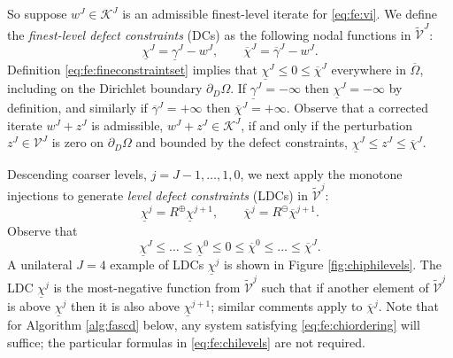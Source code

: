 \documentclass[letterpaper,final,12pt,reqno]{amsart}
\theoremstyle{cstyle}
\theoremstyle{cstyle*}
\theoremstyle{dstyle}
\numberwithin{equation}{section}
\numberwithin{figure}{section}
\numberwithin{table}{section}
\numberwithin{theorem}{section}
\newcommand{\cK}{\mathcal{K}}
\newcommand{\maxR}{R^{\bm{\oplus}}}
\newcommand{\minR}{R^{\bm{\ominus}}}
\begin{document}
So suppose $w^J \in \cK^J$ is an admissible finest-level iterate for \eqref{eq:fe:vi}.  We define the \emph{finest-level defect constraints} (DCs) \cite{GraeserKornhuber2009} as the following nodal functions in $\tilde{\mathcal{V}}^J$:
\begin{equation}
\underline{\chi}^J = \underline{\gamma}^J - w^J, \qquad \overline{\chi}^J = \overline{\gamma}^J - w^J. \label{eq:fe:defectconstraints}
\end{equation}
Definition \eqref{eq:fe:fineconstraintset} implies that $\underline{\chi}^J \le 0 \le \overline{\chi}^J$ everywhere in $\overline{\Omega}$, including on the Dirichlet boundary $\partial_D\Omega$.  If $\underline{\gamma}^J=-\infty$ then $\underline{\chi}^J=-\infty$ by definition, and similarly if $\overline{\gamma}^J=+\infty$ then $\overline{\chi}^J=+\infty$.  Observe that a corrected iterate $w^J + z^J$ is admissible, $w^J + z^J \in \cK^J$, if and only if the perturbation $z^J \in \mathcal{V}^J$ is zero on $\partial_D\Omega$ and bounded by the defect constraints, $\underline{\chi}^J \le z^J \le \overline{\chi}^J$.

Descending coarser levels, $j=J-1,\dots,1,0$, we next apply the monotone injections to generate \emph{level defect constraints} (LDCs) in $\tilde{\mathcal{V}}^j$:
\begin{equation}
\underline{\chi}^{j} = \maxR \underline{\chi}^{j+1}, \qquad \overline{\chi}^{j} = \minR \overline{\chi}^{j+1}. \label{eq:fe:chilevels}
\end{equation}
Observe that
\begin{equation}
\underline{\chi}^{J} \le \dots \le \underline{\chi}^0 \le 0 \le \overline{\chi}^0 \le \dots \le \overline{\chi}^J. \label{eq:fe:chiordering}
\end{equation}
A unilateral $J=4$ example of LDCs $\underline{\chi}^j$ is shown in Figure \ref{fig:chiphilevels}.  The LDC $\underline{\chi}^j$ is the most-negative function from $\tilde{\mathcal{V}}^j$ such that if another element of $\tilde{\mathcal{V}}^j$ is above $\underline{\chi}^j$ then it is also above $\underline{\chi}^{j+1}$; similar comments apply to $\overline{\chi}^{j}$.  Note that for Algorithm \ref{alg:fascd} below, any system satisfying \eqref{eq:fe:chiordering} will suffice; the particular formulas in \eqref{eq:fe:chilevels} are not required.
\end{document}
